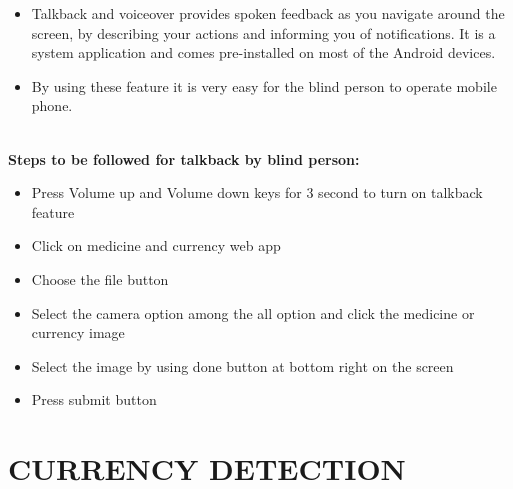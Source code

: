 \newpage
\noindent 
\begin{itemize}
 \item Talkback and voiceover provides spoken feedback as you navigate around the screen, by describing  your actions and informing you of notifications. It is a system application and comes pre-installed on most of the Android devices.
    \item By using these feature it is very easy for the blind person to operate mobile phone.\citeauthor{9020109}
\end{itemize}\\
\textbf{Steps to be followed for talkback by blind person:}
\begin{itemize}
    \item Press Volume up and Volume down keys for 3 second to turn on talkback  feature
    \item Click on medicine and currency web app
    \item Choose the file button
    \item Select the camera option among the all option and click the medicine or currency image
    \item Select the image by using done button at bottom right on the screen
    \item Press submit button
\end{itemize}

\chapter{CURRENCY DETECTION}
